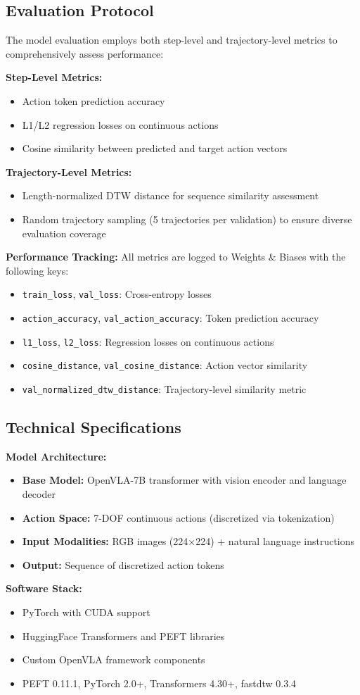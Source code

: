 \subsection{Evaluation Protocol}

The model evaluation employs both step-level and trajectory-level metrics to comprehensively assess performance:

\textbf{Step-Level Metrics:}
\begin{itemize}
    \item Action token prediction accuracy
    \item L1/L2 regression losses on continuous actions
    \item Cosine similarity between predicted and target action vectors
\end{itemize}

\textbf{Trajectory-Level Metrics:}
\begin{itemize}
    \item Length-normalized DTW distance for sequence similarity assessment
    \item Random trajectory sampling (5 trajectories per validation) to ensure diverse evaluation coverage
\end{itemize}

\textbf{Performance Tracking:} All metrics are logged to Weights \& Biases with the following keys:
\begin{itemize}
    \item \texttt{train\_loss}, \texttt{val\_loss}: Cross-entropy losses
    \item \texttt{action\_accuracy}, \texttt{val\_action\_accuracy}: Token prediction accuracy
    \item \texttt{l1\_loss}, \texttt{l2\_loss}: Regression losses on continuous actions
    \item \texttt{cosine\_distance}, \texttt{val\_cosine\_distance}: Action vector similarity
    \item \texttt{val\_normalized\_dtw\_distance}: Trajectory-level similarity metric
\end{itemize}

\subsection{Technical Specifications}

\textbf{Model Architecture:}
\begin{itemize}
    \item \textbf{Base Model:} OpenVLA-7B transformer with vision encoder and language decoder
    \item \textbf{Action Space:} 7-DOF continuous actions (discretized via tokenization)
    \item \textbf{Input Modalities:} RGB images (224×224) + natural language instructions
    \item \textbf{Output:} Sequence of discretized action tokens
\end{itemize}

\textbf{Software Stack:}
\begin{itemize}
    \item PyTorch with CUDA support
    \item HuggingFace Transformers and PEFT libraries
    \item Custom OpenVLA framework components
    \item PEFT 0.11.1, PyTorch 2.0+, Transformers 4.30+, fastdtw 0.3.4
\end{itemize}
